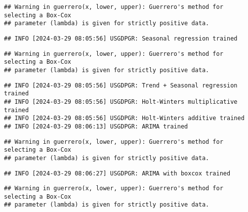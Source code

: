 \documentclass[
]{article}
\begin{document}
\begin{verbatim}
## Warning in guerrero(x, lower, upper): Guerrero's method for selecting a Box-Cox
## parameter (lambda) is given for strictly positive data.
\end{verbatim}

\begin{verbatim}
## INFO [2024-03-29 08:05:56] USGDPGR: Seasonal regression trained
\end{verbatim}

\begin{verbatim}
## Warning in guerrero(x, lower, upper): Guerrero's method for selecting a Box-Cox
## parameter (lambda) is given for strictly positive data.
\end{verbatim}

\begin{verbatim}
## INFO [2024-03-29 08:05:56] USGDPGR: Trend + Seasonal regression trained
## INFO [2024-03-29 08:05:56] USGDPGR: Holt-Winters multiplicative trained
## INFO [2024-03-29 08:05:56] USGDPGR: Holt-Winters additive trained
## INFO [2024-03-29 08:06:13] USGDPGR: ARIMA trained
\end{verbatim}

\begin{verbatim}
## Warning in guerrero(x, lower, upper): Guerrero's method for selecting a Box-Cox
## parameter (lambda) is given for strictly positive data.
\end{verbatim}

\begin{verbatim}
## INFO [2024-03-29 08:06:27] USGDPGR: ARIMA with boxcox trained
\end{verbatim}

\begin{verbatim}
## Warning in guerrero(x, lower, upper): Guerrero's method for selecting a Box-Cox
## parameter (lambda) is given for strictly positive data.
\end{verbatim}
\end{document}
